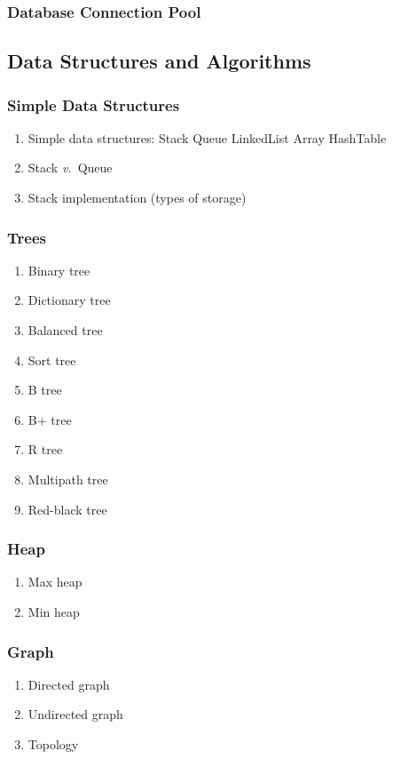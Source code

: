 \documentclass[11pt, twocolumn]{article}
\newcommand{\versus}{\textit{v.}\ }
\begin{document}
\subsubsection{Database Connection Pool}

\subsection{Data Structures and Algorithms}

\subsubsection{Simple Data Structures}
\begin{enumerate}
	\item Simple data structures:
	\subitem Stack
	\subitem Queue
	\subitem LinkedList
	\subitem Array
	\subitem HashTable
	\item Stack \versus Queue
	\item Stack implementation (types of storage)
\end{enumerate}

\subsubsection{Trees}
\begin{enumerate}
	\item Binary tree
	\item Dictionary tree
	\item Balanced tree
	\item Sort tree
	\item B tree
	\item B+ tree
	\item R tree
	\item Multipath tree
	\item Red-black tree
\end{enumerate}

\subsubsection{Heap}
\begin{enumerate}
	\item Max heap
	\item Min heap
\end{enumerate}

\subsubsection{Graph}
\begin{enumerate}
	\item Directed graph
	\item Undirected graph
	\item Topology
\end{enumerate}
\end{document}
